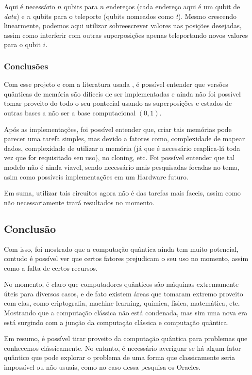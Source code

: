 \documentclass{article}
\begin{document}
Aqui é necessário $n$ qubits para $n$ endereços (cada endereço aqui é um qubit de \emph{data}) e $n$ qubits para o teleporte (qubits nomeados como \emph{t}). Mesmo crescendo linearmente, podemos aqui utilizar sobreescrever valores nas posições desejadas, assim como interferir com outras superposições apenas teleportando novos valores para o qubit $i$.

\subsubsection{Conclusões}

Com esse projeto e com a literatura usada \cite{jaques2023qram}\cite{Giovannetti_2008}, é possível entender que versões quânticas de memória são dificeis de ser implementadas e ainda não foi possível tomar proveito do todo o seu pontecial usando as superposições e estados de outras bases a não ser a base computacional $({0,1})$.

Após as implementações, foi possível entender que, criar tais memórias pode parecer uma tarefa simples, mas devido a fatores como, complexidade de mapear dados, complexidade de utilizar a memória (já que é necessário reaplica-lá toda vez que for requisitado seu uso), no cloning, etc. Foi possível entender que tal modelo não é ainda viavel, sendo necessário mais pesquisadas focadas no tema, asim como possíveis implementações em um Hardware futuro.

Em suma, utilizar tais circuitos agora não é das tarefas mais faceis, assim como não necessariamente trará resultados no momento.


\subsection{Conclusão}

Com isso, foi mostrado que a computação quântica ainda tem muito potencial, contudo é possível ver que certos fatores prejudicam o seu uso no momento, assim como a falta de certos recursos.

No momento, é claro que computadores quânticos são máquinas extremamente úteis para diversos casos, e de fato existem áreas que tomaram extremo proveito com elas, como criptografia, machine learning, química, física, matemática, etc. Mostrando que a computação clássica não está condenada, mas sim uma nova era está surgindo com a junção da computação clássica e computação quântica.

Em resumo, é possível tirar proveito da computação quântica para problemas que conhecemos clássicamente. No entanto, é necessário averiguar se há algum fator quântico que pode explorar o problema de uma forma que classicamente seria impossível ou não usuais, como no caso dessa pesquisa os Oracles.
\end{document}
